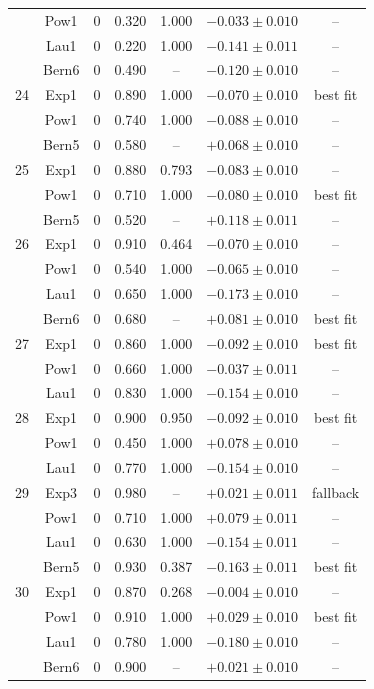 \begin{table}[htbp]
\begin{center}
{\begin{tabular}{|c|c|c|c|c|c|c|}
       & Pow1 & 0 & 0.320 & 1.000 & $-0.033 \pm 0.010$ & -- \\
       & Lau1 & 0 & 0.220 & 1.000 & $-0.141 \pm 0.011$ & -- \\
       & Bern6 & 0 & 0.490 & -- & $-0.120 \pm 0.010$ & -- \\
      \hline
      24 & Exp1 & 0 & 0.890 & 1.000 & $-0.070 \pm 0.010$ & best fit \\
       & Pow1 & 0 & 0.740 & 1.000 & $-0.088 \pm 0.010$ & -- \\
       & Bern5 & 0 & 0.580 & -- & $+0.068 \pm 0.010$ & -- \\
      \hline
      25 & Exp1 & 0 & 0.880 & 0.793 & $-0.083 \pm 0.010$ & -- \\
       & Pow1 & 0 & 0.710 & 1.000 & $-0.080 \pm 0.010$ & best fit \\
       & Bern5 & 0 & 0.520 & -- & $+0.118 \pm 0.011$ & -- \\
      \hline
      26 & Exp1 & 0 & 0.910 & 0.464 & $-0.070 \pm 0.010$ & -- \\
       & Pow1 & 0 & 0.540 & 1.000 & $-0.065 \pm 0.010$ & -- \\
       & Lau1 & 0 & 0.650 & 1.000 & $-0.173 \pm 0.010$ & -- \\
       & Bern6 & 0 & 0.680 & -- & $+0.081 \pm 0.010$ & best fit \\
      \hline
      27 & Exp1 & 0 & 0.860 & 1.000 & $-0.092 \pm 0.010$ & best fit \\
       & Pow1 & 0 & 0.660 & 1.000 & $-0.037 \pm 0.011$ & -- \\
       & Lau1 & 0 & 0.830 & 1.000 & $-0.154 \pm 0.010$ & -- \\
      \hline
      28 & Exp1 & 0 & 0.900 & 0.950 & $-0.092 \pm 0.010$ & best fit \\
       & Pow1 & 0 & 0.450 & 1.000 & $+0.078 \pm 0.010$ & -- \\
       & Lau1 & 0 & 0.770 & 1.000 & $-0.154 \pm 0.010$ & -- \\
      \hline
      29 & Exp3 & 0 & 0.980 & -- & $+0.021 \pm 0.011$ & fallback \\
       & Pow1 & 0 & 0.710 & 1.000 & $+0.079 \pm 0.011$ & -- \\
       & Lau1 & 0 & 0.630 & 1.000 & $-0.154 \pm 0.011$ & -- \\
       & Bern5 & 0 & 0.930 & 0.387 & $-0.163 \pm 0.011$ & best fit \\
      \hline
      30 & Exp1 & 0 & 0.870 & 0.268 & $-0.004 \pm 0.010$ & -- \\
       & Pow1 & 0 & 0.910 & 1.000 & $+0.029 \pm 0.010$ & best fit \\
       & Lau1 & 0 & 0.780 & 1.000 & $-0.180 \pm 0.010$ & -- \\
       & Bern6 & 0 & 0.900 & -- & $+0.021 \pm 0.010$ & -- \\
      \hline
    \end{tabular}
    }
  \end{center}
\end{table}
